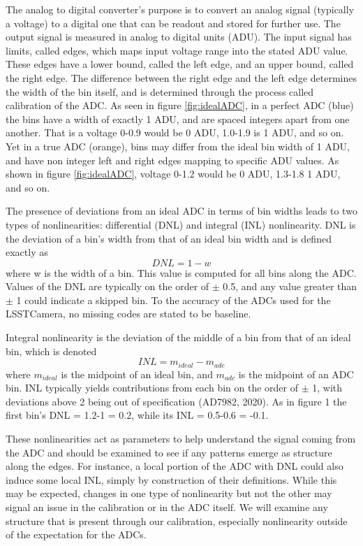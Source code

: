 \documentclass[11pt, letterpaper]{article}
\begin{document}
The analog to digital converter’s purpose is to convert an analog signal (typically a voltage) to a digital one that can be readout and stored for further use. 
The output signal is measured in analog to digital units (ADU). 
The input signal has limits, called edges, which maps input voltage range into the stated ADU value. 
These edges have a lower bound, called the left edge, and an upper bound, called the right edge.
The difference between the right edge and the left edge determines the width of the bin itself, and is determined through the process called calibration of the ADC. 
As seen in figure \ref{fig:idealADC}, in a perfect ADC (blue) the bins have a width of exactly 1 ADU, and are spaced integers apart from one another. 
That is a voltage 0-0.9 would be 0 ADU, 1.0-1.9 is 1 ADU, and so on. 
Yet in a true ADC (orange), bins may differ from the ideal bin width of 1 ADU, and have non integer left and right edges mapping to specific ADU values. 
As shown in figure \ref{fig:idealADC}, voltage 0-1.2 would be 0 ADU, 1.3-1.8 1 ADU, and so on. 
\indent 


The presence of deviations from an ideal ADC in terms of bin widths leads to two types of nonlinearities: differential (DNL) and integral (INL) nonlinearity. 
DNL is the deviation of a bin's width from that of an ideal bin width and is defined exactly as
\begin{equation}
DNL =1- w  
\label{eq: DNL}
\end{equation}
where w is the width of a bin. 
This value is computed for all bins along the ADC. 
Values of the DNL are typically on the order of $\pm$ 0.5, and any value greater than $\pm$ 1 could indicate a skipped bin. 
To the accuracy of the ADCs used for the LSSTCamera, no missing codes are stated to be baseline.
\indent


Integral nonlinearity is the deviation of the middle of a bin from that of an ideal bin, which is denoted 
\begin{equation}
INL = m_{ideal} - m_{adc} 
\label{eq: INL}
\end{equation}
where $m_{ideal}$ is the midpoint of an ideal bin, and $m_{adc}$ is the midpoint of an ADC bin. 
INL typically yields contributions from each bin on the order of $\pm$ 1, with deviations above 2 being out of specification (AD7982, 2020). 
As in figure 1 the first bin's DNL = 1.2-1 = 0.2, while its INL = 0.5-0.6 = -0.1. 
\indent


These nonlinearities act as parameters to help understand the signal coming from the ADC and should be examined to see if any patterns emerge as structure along the edges. 
For instance, a local portion of the ADC with DNL could also induce some local INL, simply by construction of their definitions.
While this may be expected, changes in one type of nonlinearity but not the other may signal an issue in the calibration or in the ADC itself.
We will examine any structure that is present through our calibration, especially nonlinearity outside of the expectation for the ADCs. 
\end{document}
